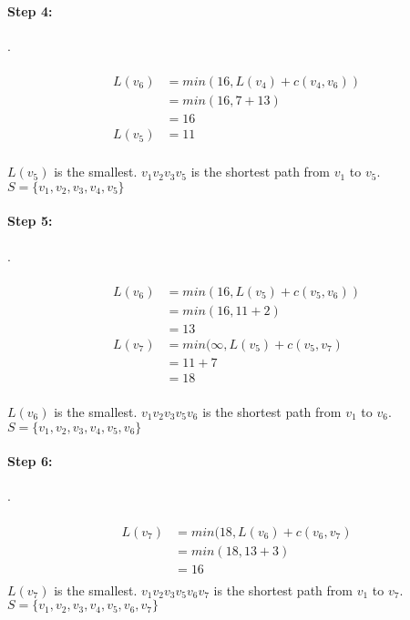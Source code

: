 \documentclass{article}
\begin{document}
	\paragraph{Step 4:} .\\
	\\
	\begin{align*}
		L(v_6) &= min(16, L(v_4) + c(v_4, v_6))\\
	&= min(16, 7 + 13)\\
	&= 16\\
	L(v_5) &= 11\\
	\end{align*}

			
	$L(v_5) $ is the smallest. $v_1v_2v_3v_5$ is the shortest path from $v_1$ to $v_5$.\\
	$S = \{v_1, v_2, v_3, v_4, v_5\}$\\	
	
	\paragraph{Step 5:} .\\
		\\
	\begin{align*}
	L(v_6) &= min(16, L(v_5) + c(v_5, v_6))\\
&= min(16, 11 + 2)\\
&= 13\\
L(v_7) &= min(\infty, L(v_5) + c(v_5, v_7)\\
&= 11 + 7\\
&= 18\\
	\end{align*}

		$L(v_6) $ is the smallest. $v_1v_2v_3v_5v_6$ is the shortest path from $v_1$ to $v_6$.\\
	$S = \{v_1, v_2, v_3, v_4, v_5, v_6\}$\\
	
	\paragraph{Step 6:} .\\
	\\
	\begin{align*}
	L(v_7) &= min(18, L(v_6) + c(v_6, v_7)\\
	&= min(18, 13 + 3)\\
	&= 16\\	
	\end{align*} %
	$L(v_7) $ is the smallest. $v_1v_2v_3v_5v_6v_7$ is the shortest path from $v_1$ to $v_7$.\\
	$S = \{v_1, v_2, v_3, v_4, v_5, v_6, v_7\}$\\
		
\end{document}
